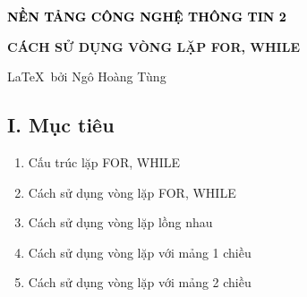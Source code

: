 
\begin{center}
    \textbf{\textcolor{black}{\large\LARGE NỀN TẢNG CÔNG NGHỆ THÔNG TIN 2}}

    \textbf{\large CÁCH SỬ DỤNG VÒNG LẶP FOR, WHILE}

    \large\LaTeX\, bởi Ngô Hoàng Tùng
\end{center}


\subsection*{\textbf{I. Mục tiêu}}
\begin{enumerate}[label=\alph*.]
    \item Cấu trúc lặp FOR, WHILE
    \item Cách sử dụng vòng lặp FOR, WHILE
    \item Cách sử dụng vòng lặp lồng nhau
    \item Cách sử dụng vòng lặp với mảng 1 chiều
    \item Cách sử dụng vòng lặp với mảng 2 chiều
\end{enumerate}
